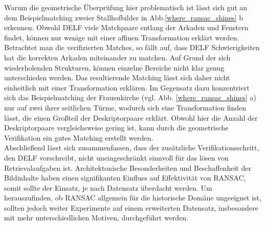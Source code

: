 Warum die geometrische Überprüfung hier problematisch ist lässt sich gut an dem Beispielmatching zweier Stallhofbilder in Abb.\ref{where_ransac_shines} b erkennen. Obwohl DELF viele Matchpaare entlang der Arkaden und Fenstern findet, können nur wenige mit einer affinen Transformation erklärt werden. Betrachtet man die verifizierten Matches, so fällt auf, dass DELF Schwierigkeiten hat die korrekten Arkaden miteinander zu matchen. Auf Grund der sich wiederholenden Strukturen, können einzelne Bereiche nicht klar genug unterschieden werden. Das resultierende Matching lässt sich daher nicht einheitlich mit einer Transformation erklären. Im Gegensatz dazu konzentriert sich das Beispielmatching der Frauenkirche (vgl. Abb. \ref{where_ransac_shines} a) nur auf zwei ihrer seitlichen Türme, wodurch sich eine Transformation finden lässt, die einen Großteil der Deskriptorpaare erklärt. Obwohl hier die Anzahl der Deskriptorpaare vergleichsweise gering ist, kann durch die geometrische Verifikation ein gutes Matching erstellt werden.
\\
Abschließend lässt sich zusammenfassen, dass der zusätzliche Verifikationsschritt, den DELF vorschreibt, nicht uneingeschränkt sinnvoll für das lösen von Retrievalaufgaben ist. Architektonische Besonderheiten und Beschaffenheit der Bildinhalte haben einen signifikanten Einfluss auf Effektivität von RANSAC, somit sollte der Einsatz, je nach Datensatz überdacht werden. Um herauszufinden, ob RANSAC allgemein für die historische Domäne ungeeignet ist, sollten jedoch weiter Experimente auf einem erweiterten Datensatz, insbesondere mit mehr unterschiedlichen Motiven, durchgeführt werden.


